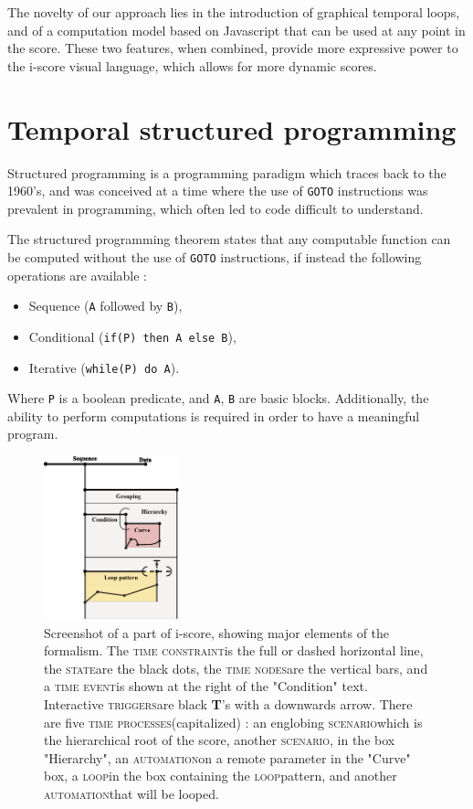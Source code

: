 \documentclass{article}
\newcommand{\scenario}{\textsc{scenario}}
\newcommand{\Loop}{\textsc{loop}}
\newcommand{\states}{\textsc{state}}
\newcommand{\timeevent}{\textsc{time event}}
\newcommand{\timenodes}{\textsc{time nodes}}
\newcommand{\timeconstraint}{\textsc{time constraint}}
\newcommand{\timeprocesses}{\textsc{time processes}}
\newcommand{\automation}{\textsc{automation}}
\newcommand{\triggers}{\textsc{triggers}}
\begin{document}
The novelty of our approach lies in the introduction of graphical temporal loops, and of a computation model 
based on Javascript that can be used at any point in the score. 
These two features, when combined, provide more expressive power to the i-score visual language, 
which allows for more dynamic scores.

\section{Temporal structured programming}
Structured programming is a programming paradigm which traces 
back to the 1960's, and was conceived at a time where the use of \lstinline{GOTO}
instructions was prevalent in programming, which often led to code difficult to understand.

The structured programming theorem\cite{bohm1966flow,mills1972mathematical} states that any computable function can be computed 
without the use of \lstinline{GOTO} instructions, if instead the following operations are available : 
\begin{itemize}
    \item Sequence (\lstinline{A} followed by \lstinline{B}), 
    \item Conditional (\lstinline{if(P) then A else B}), 
    \item Iterative (\lstinline{while(P) do A}).
\end{itemize}

Where \lstinline|P| is a boolean predicate, and \lstinline|A|, \lstinline|B| are basic blocks.
Additionally, the ability to perform computations is required in order to have a meaningful program.

\begin{figure}
    \centering
    \includegraphics[width=0.35\textwidth]{images/hierarchy.eps}
    \caption{Screenshot of a part of i-score, showing major elements of the formalism. The \timeconstraint is the full or dashed horizontal line, the \states are the black dots, the \timenodes are the vertical bars, and a \timeevent is shown at the right of the "Condition" text. Interactive \triggers are black \textbf{T}'s with a downwards arrow. There are five \timeprocesses (capitalized) : an englobing \scenario which is the hierarchical root of the score, another \scenario, in the box "Hierarchy", an \automation on a remote parameter in the "Curve" box, a \Loop in the box containing the \Loop pattern, and another \automation that will be looped.}
    \label{fig.hierarchy}
\end{figure}
\end{document}
